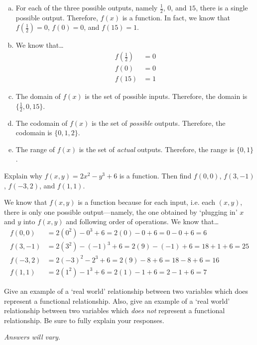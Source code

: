 \documentclass[11pt,letterpaper]{article}
\begin{document}
\sol 
\begin{enumerate}[(a)]
\item For each of the three possible outputs, namely $\frac{1}{2}$, $0$, and $15$, there is a single possible output. Therefore, $f(x)$ is a function. In fact, we know that $f(\frac{1}{2})= 0$, $f(0)= 0$, and $f(15)= 1$. \pspace

\item We know that\dots
	\[
	\begin{aligned}
	f\left( \frac{1}{2} \right)&= 0 \\[0.3cm]
	f(0)&= 0 \\[0.3cm]
	f(15)&= 1
	\end{aligned}
	\] \pspace

\item The domain of $f(x)$ is the set of possible inputs. Therefore, the domain is $\{ \frac{1}{2}, 0, 15 \}$. \pspace

\item The codomain of $f(x)$ is the set of \textit{possible} outputs. Therefore, the codomain is $\{ 0, 1, 2 \}$. \pspace

\item The range of $f(x)$ is the set of \textit{actual} outputs. Therefore, the range is $\{ 0, 1 \}$. 
\end{enumerate}



\newpage



 Explain why $f(x, y)= 2x^2 - y^3 + 6$ is a function. Then find $f(0, 0)$, $f(3, -1)$, $f(-3, 2)$, and $f(1, 1)$. \pspace

\sol We know that $f(x, y)$ is a function because for each input, i.e. each $(x, y)$, there is only one possible output---namely, the one obtained by `plugging in' $x$ and $y$ into $f(x, y)$ and following order of operations. We know that\dots
	\[
	\begin{aligned}
	f(0, 0)&= 2(0^2) - 0^3 + 6= 2(0) - 0 + 6= 0 - 0 + 6= 6 \\[0.3cm]
	f(3, -1)&= 2(3^2) - (-1)^3 + 6= 2(9) - (-1) + 6= 18 + 1 + 6= 25 \\[0.3cm]
	f(-3, 2)&= 2(-3)^2 - 2^3 + 6= 2(9) - 8 + 6= 18 - 8 + 6= 16 \\[0.3cm]
	f(1, 1)&= 2(1^2) - 1^3 + 6= 2(1) - 1 + 6= 2 - 1 + 6= 7
	\end{aligned}
	\]



\newpage



 Give an example of a `real world' relationship between two variables which does represent a functional relationship. Also, give an example of a `real world' relationship between two variables which \textit{does not} represent a functional relationship. Be sure to fully explain your responses. \pspace

\vfill
\begin{center}
{\itshape Answers will vary.}
\end{center}
\vfill
\end{document}
